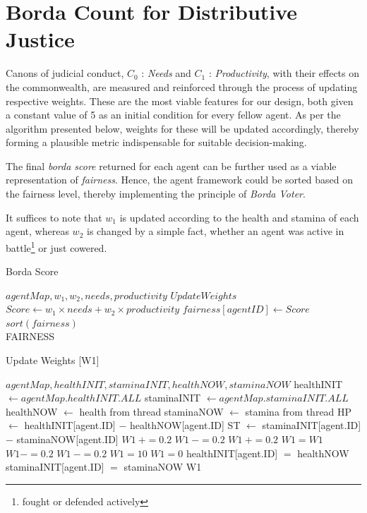 \section{Borda Count for Distributive Justice }

Canons of judicial conduct, $C_0$ : \textit{Needs} and $C_1$ : \textit{Productivity}, with their effects on the commonwealth, are measured and reinforced through the process of updating respective weights. These are the most viable features for our design, both given a constant value of 5 as an initial condition for every fellow agent. As per the algorithm presented below, weights for these will be updated accordingly, thereby forming a plausible metric indispensable for suitable decision-making.

The final \textit{borda score} returned for each agent can be further used as a viable representation of \textit{fairness}. Hence, the agent framework could be sorted based on the fairness level, thereby implementing the principle of \textit{Borda Voter}.

It suffices to note that $w_1$ is updated according to the health and stamina of each agent, whereas $w_2$ is changed by a simple fact, whether an agent was active in battle\footnote{fought or defended actively} or just cowered.


\begin{algorithm}[htb]
\caption{Borda Score}\label{alg:5}
\begin{algorithmic} 
\scriptsize
\Require $agentMap, w_1, w_2, needs, productivity$
\State $Update Weights$
\State $Score \leftarrow w_1 \times needs + w_2 \times productivity$
\State $fairness[agentID] \leftarrow Score$
\EndWhile
\State $sort(fairness)$\\
\Return FAIRNESS
\end{algorithmic}
\end{algorithm}

\begin{algorithm}[htb]
\caption{Update Weights [W1]}\label{alg:6}
\begin{algorithmic} 
\scriptsize
\Require $agentMap, healthINIT, staminaINIT,healthNOW, staminaNOW$
\State healthINIT $\leftarrow agentMap.healthINIT.ALL$
\State staminaINIT $\leftarrow agentMap.staminaINIT.ALL$
\State healthNOW $\leftarrow$ health from thread
\State staminaNOW $\leftarrow$ stamina from thread
\State HP $\leftarrow$ healthINIT[agent.ID] $-$ healthNOW[agent.ID]
\State ST $\leftarrow$ staminaINIT[agent.ID] $-$ staminaNOW[agent.ID]
\State $W1~+= 0.2$
\Else
\State $W1~-= 0.2$
\EndIf
{}
\State $W1~+= 0.2$
\Else
{}
\State $W1 = W1$
\Else
\State $W1 -= 0.2$
\EndIf
\State $W1~-= 0.2$
\EndIf
{}
\State $W1=10$
\EndIf
{}
\State $W1 = 0$
\EndIf
\State healthINIT[agent.ID] $=$ healthNOW
\State staminaINIT[agent.ID] $=$ staminaNOW
\Return W1
\EndIf
\end{algorithmic}
\end{algorithm}


